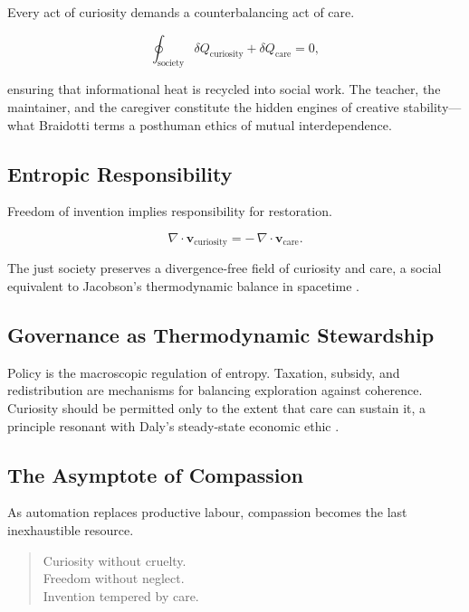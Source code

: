 \documentclass[12pt,a4paper]{article}
\begin{document}
Every act of curiosity demands a counterbalancing act of care.

\begin{equation}
\oint_{\text{society}} \delta Q_{\text{curiosity}}
+ \delta Q_{\text{care}} = 0,
\end{equation}

ensuring that informational heat is recycled into social work.  
The teacher, the maintainer, and the caregiver constitute 
the hidden engines of creative stability---what Braidotti \citep{braidotti2017posthuman} 
terms a posthuman ethics of mutual interdependence.

\subsection{Entropic Responsibility}

Freedom of invention implies responsibility for restoration.

\[
\nabla \!\cdot\! \mathbf{v}_{\text{curiosity}} =
-\,\nabla \!\cdot\! \mathbf{v}_{\text{care}}.
\]

The just society preserves a divergence-free field of curiosity and care, 
a social equivalent to Jacobson’s thermodynamic balance in spacetime 
\citep{jacobson1995thermodynamics}.

\subsection{Governance as Thermodynamic Stewardship}

Policy is the macroscopic regulation of entropy.
Taxation, subsidy, and redistribution 
are mechanisms for balancing exploration against coherence.
Curiosity should be permitted only to the extent that care can sustain it,
a principle resonant with Daly’s steady-state economic ethic 
\citep{daly1977steady,foster2020steady}.

\subsection{The Asymptote of Compassion}

As automation replaces productive labour, compassion becomes 
the last inexhaustible resource.
\begin{quote}
Curiosity without cruelty.\\
Freedom without neglect.\\
Invention tempered by care.
\end{quote}
\end{document}
